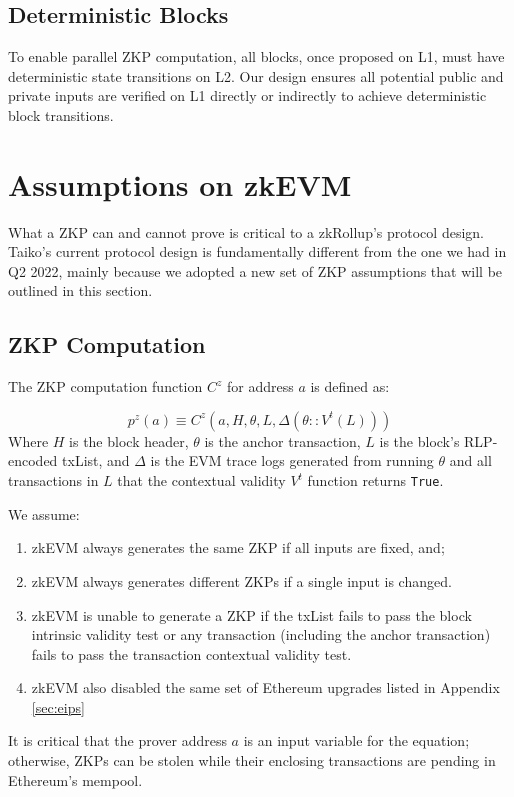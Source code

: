 \documentclass[9pt,oneside]{amsart}
\begin{document}
\begin{multicols}{2}
\subsection{Deterministic Blocks}
To enable parallel ZKP computation, all blocks, once proposed on L1, must have deterministic state transitions on L2. Our design ensures all potential public and private inputs are verified on L1 directly or indirectly to achieve deterministic block transitions.

\section{Assumptions on zkEVM}

What a ZKP can and cannot prove is critical to a zkRollup's protocol design. Taiko's current protocol design is fundamentally different from the one we had in Q2 2022, mainly because we adopted a new set of ZKP assumptions that will be outlined in this section.


\subsection{ZKP Computation} The ZKP computation function $C^z$ for address $a$ is defined as:


\begin{equation}
    p^z(a) \equiv C^z(a, H,\theta, L, \Delta(\theta::V^t(L)) )
\end{equation}
Where $H$ is the block header, $\theta$ is the anchor transaction, $L$ is the block's RLP-encoded txList, and $\Delta$ is the EVM trace logs generated from running $\theta$ and all transactions in $L$ that the contextual validity $V^t$ function returns \texttt{True}.

We assume:
\begin{enumerate}
\item zkEVM always generates the same ZKP if all inputs are fixed, and;
\item zkEVM always generates different ZKPs if a single input is changed.
\item zkEVM is unable to generate a ZKP if the txList fails to pass the block intrinsic validity test or any transaction (including the anchor transaction) fails to pass the transaction contextual validity test.
\item zkEVM also disabled the same set of Ethereum upgrades listed in Appendix \ref{sec:eips}
\end{enumerate}


It is critical that the prover address $a$ is an input variable for the equation; otherwise, ZKPs can be stolen while their enclosing transactions are pending in Ethereum's mempool.


\end{multicols}
\end{document}
